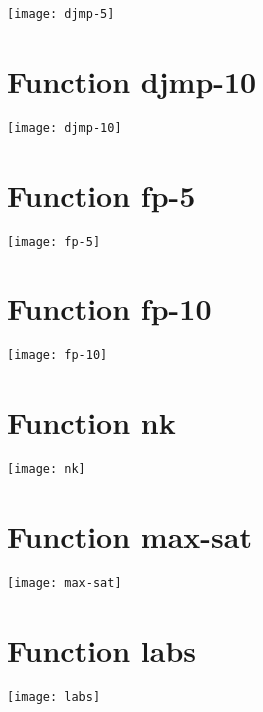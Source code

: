 \begin{center}
\texttt{[image: djmp-5]}
\end{center}

\section{Function djmp-10}

\begin{center}
\texttt{[image: djmp-10]}
\end{center}

\section{Function fp-5}

\begin{center}
\texttt{[image: fp-5]}
\end{center}

\section{Function fp-10}

\begin{center}
\texttt{[image: fp-10]}
\end{center}

\section{Function nk}

\begin{center}
\texttt{[image: nk]}
\end{center}

\section{Function max-sat}

\begin{center}
\texttt{[image: max-sat]}
\end{center}

\section{Function labs}

\begin{center}
\texttt{[image: labs]}
\end{center}

